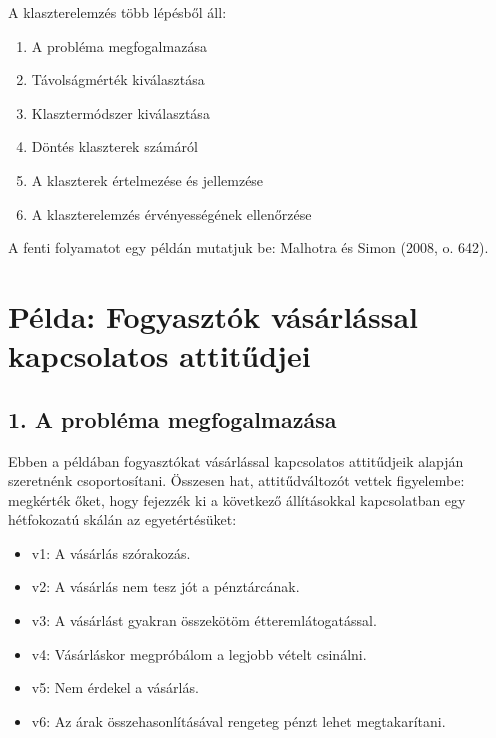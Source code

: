 \documentclass[
  letterpaper,
]{krantz}
\providecommand{\tightlist}{%
  \setlength{\itemsep}{0pt}\setlength{\parskip}{0pt}}\usepackage{longtable,booktabs,array}
\begin{document}
A klaszterelemzés több lépésből áll:

\begin{enumerate}
\def\labelenumi{\arabic{enumi}.}
\tightlist
\item
  A probléma megfogalmazása
\item
  Távolságmérték kiválasztása
\item
  Klasztermódszer kiválasztása
\item
  Döntés klaszterek számáról
\item
  A klaszterek értelmezése és jellemzése
\item
  A klaszterelemzés érvényességének ellenőrzése
\end{enumerate}

A fenti folyamatot egy példán mutatjuk be: Malhotra és Simon (2008, o.
642).

\hypertarget{puxe9lda-fogyasztuxf3k-vuxe1suxe1rluxe1ssal-kapcsolatos-attitux171djei}{%
\section{Példa: Fogyasztók vásárlással kapcsolatos
attitűdjei}\label{puxe9lda-fogyasztuxf3k-vuxe1suxe1rluxe1ssal-kapcsolatos-attitux171djei}}

\hypertarget{a-probluxe9ma-megfogalmazuxe1sa}{%
\subsection{1. A probléma
megfogalmazása}\label{a-probluxe9ma-megfogalmazuxe1sa}}

Ebben a példában fogyasztókat vásárlással kapcsolatos attitűdjeik
alapján szeretnénk csoportosítani. Összesen hat, attitűdváltozót vettek
figyelembe: megkérték őket, hogy fejezzék ki a következő állításokkal
kapcsolatban egy hétfokozatú skálán az egyetértésüket:

\begin{itemize}
\tightlist
\item
  v1: A vásárlás szórakozás.
\item
  v2: A vásárlás nem tesz jót a pénztárcának.
\item
  v3: A vásárlást gyakran összekötöm étteremlátogatással.
\item
  v4: Vásárláskor megpróbálom a legjobb vételt csinálni.
\item
  v5: Nem érdekel a vásárlás.
\item
  v6: Az árak összehasonlításával rengeteg pénzt lehet megtakarítani.
\end{itemize}
\end{document}
